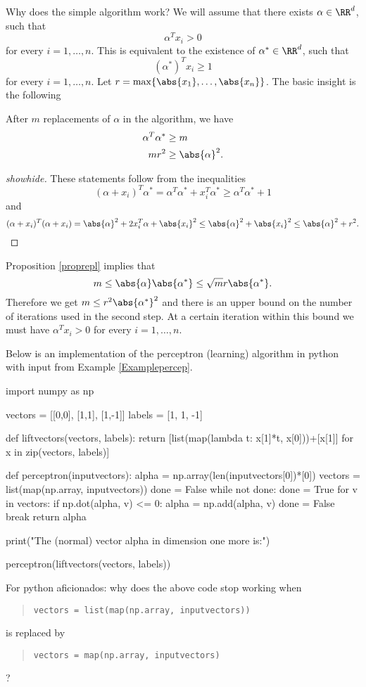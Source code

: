 \documentclass{article}
\begin{document}
\begin{hideinbutton}{Why does the simple algorithm work?}
  We will assume that there exists $\alpha\in \RR^d$, such that
  $$
  \alpha^T x_i > 0
  $$
  for every $i = 1, \dots, n$. This is equivalent to the existence of $\alpha^*\in \RR^d$, such that
  $$
  (\alpha^*)^T x_i \geq 1
  $$
  for every $i = 1, \dots, n$. Let $r = \max\{\abs{x_1}, \dots, \abs{x_n}\}$. The basic insight
  is the following
  \begin{proposition}\label{proprepl}
    After $m$ replacements of $\alpha$ in the algorithm, we have
    \begin{align*}
      \alpha^T \alpha^* &\geq m \\
      m r^2 &\geq \abs{\alpha}^2.
    \end{align*}
  \end{proposition}
  \begin{proof}[showhide]
    These statements follow from the inequalities
    $$
    (\alpha + x_i)^T \alpha^* = \alpha^T \alpha^* + x_i^T \alpha^* \geq \alpha^T \alpha^* + 1
    $$
    and
    $$
    (\alpha + x_i)^T (\alpha + x_i) = \abs{\alpha}^2 + 2 x_i^T \alpha + \abs{x_i}^2 \leq \abs{\alpha}^2 +
    \abs{x_i}^2 \leq \abs{\alpha}^2 + r^2.
    $$
  \end{proof}

  Proposition \ref{proprepl} implies that
$$
m \leq \abs{\alpha} \abs{\alpha^*} \leq \sqrt{m} r \abs{\alpha^*}.
$$
Therefore we get $m\leq r^2 \abs{\alpha^*}^2$ and there is an upper bound on the number of
iterations used in the second step. At a certain iteration within this bound
we must have $\alpha^T x_i > 0$ for every $i=1, \dots, n$.
\end{hideinbutton}

Below is an implementation of the perceptron (learning) algorithm
in python with input from Example \ref{Examplepercep}.

\begin{sage}
import numpy as np

vectors = [[0,0], [1,1], [1,-1]]
labels = [1, 1, -1]

def liftvectors(vectors, labels):
    return [list(map(lambda t: x[1]*t, x[0]))+[x[1]] for x in zip(vectors, labels)]

def perceptron(inputvectors):
    alpha = np.array(len(inputvectors[0])*[0])
    vectors = list(map(np.array, inputvectors))
    done = False
    while not done:
        done = True
        for v in vectors:
            if np.dot(alpha, v) <= 0:
               alpha = np.add(alpha, v)  
               done = False
               break
    return alpha

print("The (normal) vector alpha in dimension one more is:")
    
perceptron(liftvectors(vectors, labels))    
\end{sage}

\beginshex
For python aficionados: why does the above code stop working when
\begin{quote}
  \texttt{vectors = list(map(np.array, inputvectors))}
\end{quote}
is replaced by
\begin{quote}
  \texttt{vectors = map(np.array, inputvectors)}
\end{quote}
?
\endshex
\end{document}
